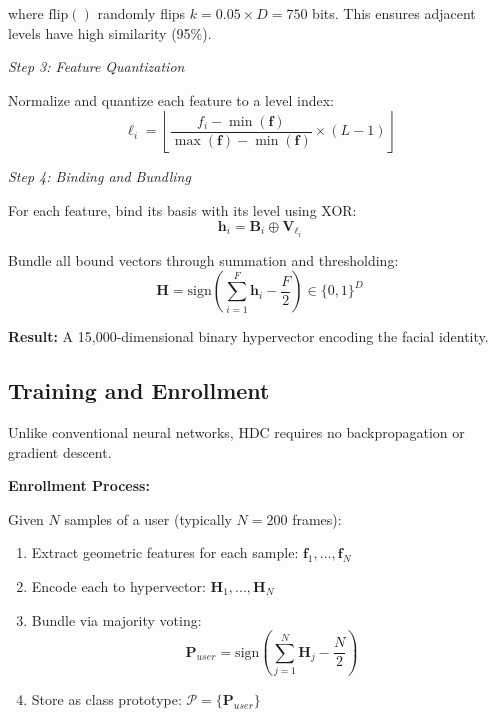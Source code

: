 \documentclass[a4paper,12pt]{article}
\begin{document}
where $\text{flip}()$ randomly flips $k = 0.05 \times D = 750$ bits. This ensures adjacent levels have high similarity (95\%).

\textit{Step 3: Feature Quantization}

Normalize and quantize each feature to a level index:
\begin{equation}
\ell_i = \left\lfloor \frac{f_i - \min(\mathbf{f})}{\max(\mathbf{f}) - \min(\mathbf{f})} \times (L-1) \right\rfloor
\end{equation}

\textit{Step 4: Binding and Bundling}

For each feature, bind its basis with its level using XOR:
\begin{equation}
\mathbf{h}_i = \mathbf{B}_i \oplus \mathbf{V}_{\ell_i}
\end{equation}

Bundle all bound vectors through summation and thresholding:
\begin{equation}
\mathbf{H} = \text{sign}\left(\sum_{i=1}^F \mathbf{h}_i - \frac{F}{2}\right) \in \{0,1\}^D
\end{equation}

\textbf{Result:} A 15,000-dimensional binary hypervector encoding the facial identity.

\subsection{Training and Enrollment}

Unlike conventional neural networks, HDC requires no backpropagation or gradient descent.

\textbf{Enrollment Process:}

Given $N$ samples of a user (typically $N = 200$ frames):

\begin{enumerate}
    \item Extract geometric features for each sample: $\mathbf{f}_1, ..., \mathbf{f}_N$
    \item Encode each to hypervector: $\mathbf{H}_1, ..., \mathbf{H}_N$
    \item Bundle via majority voting:
    \begin{equation}
    \mathbf{P}_{user} = \text{sign}\left(\sum_{j=1}^N \mathbf{H}_j - \frac{N}{2}\right)
    \end{equation}
    \item Store as class prototype: $\mathcal{P} = \{\mathbf{P}_{user}\}$
\end{enumerate}
\end{document}
